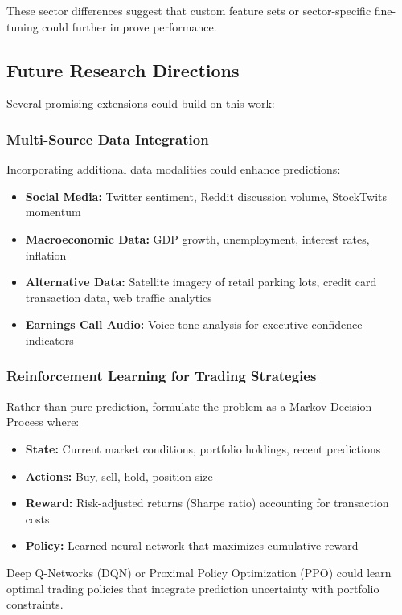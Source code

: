 \documentclass[conference]{IEEEtran}
\begin{document}
These sector differences suggest that custom feature sets or sector-specific fine-tuning could further improve performance.

\subsection{Future Research Directions}

Several promising extensions could build on this work:

\subsubsection{Multi-Source Data Integration}
Incorporating additional data modalities could enhance predictions:

\begin{itemize}
\item \textbf{Social Media:} Twitter sentiment, Reddit discussion volume, StockTwits momentum
\item \textbf{Macroeconomic Data:} GDP growth, unemployment, interest rates, inflation
\item \textbf{Alternative Data:} Satellite imagery of retail parking lots, credit card transaction data, web traffic analytics
\item \textbf{Earnings Call Audio:} Voice tone analysis for executive confidence indicators
\end{itemize}

\subsubsection{Reinforcement Learning for Trading Strategies}
Rather than pure prediction, formulate the problem as a Markov Decision Process where:

\begin{itemize}
\item \textbf{State:} Current market conditions, portfolio holdings, recent predictions
\item \textbf{Actions:} Buy, sell, hold, position size
\item \textbf{Reward:} Risk-adjusted returns (Sharpe ratio) accounting for transaction costs
\item \textbf{Policy:} Learned neural network that maximizes cumulative reward
\end{itemize}

Deep Q-Networks (DQN) or Proximal Policy Optimization (PPO) could learn optimal trading policies that integrate prediction uncertainty with portfolio constraints.
\end{document}
